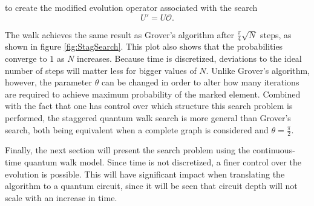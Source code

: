 \documentclass[../../dissertation.tex]{subfiles}
\begin{document}
to create the modified evolution operator associated with the search
\begin{equation}
	U' = U\mathcal{O}.
	\label{eq:stagSearchSimulModEvoOp}
\end{equation}\par
The walk achieves the same result as Grover's algorithm after
$\frac{\pi}{4}\sqrt{N}$ steps, as shown in figure \ref{fig:StagSearch}. This
plot also shows that the probabilities converge to $1$ as $N$ increases.
Because time is discretized, deviations to the ideal number of steps will
matter less for bigger values of $N$.
Unlike Grover's algorithm, however, the parameter $\theta$ can be changed in
order to alter how many iterations are required to achieve maximum probability
of the marked element. Combined with the fact that one has control over which
structure this search problem is performed, the staggered quantum walk search is
more general than Grover's search, both being equivalent
when a complete graph is considered and $\theta = \frac{\pi}{2}$.\par
Finally, the next section will present the search problem using the
continuous-time quantum walk model. Since time is not discretized, a finer
control over the evolution is possible. This will have significant impact when
translating the algorithm to a quantum circuit, since it will be seen that
circuit depth will not scale with an increase in time. 
\end{document}
